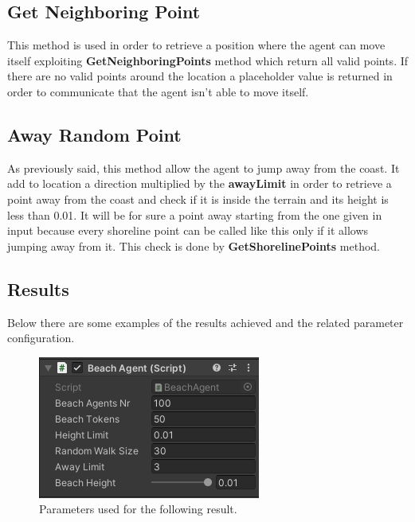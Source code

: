 \documentclass[12pt]{article}
\begin{document}
    \subsection{Get Neighboring Point}
    This method is used in order to retrieve a position where the agent can move itself exploiting \textbf{GetNeighboringPoints} method which return all
    valid points. If there are no valid points around the location a placeholder value is returned in order to communicate that the agent isn't able
    to move itself.

    \subsection{Away Random Point}
    As previously said, this method allow the agent to jump away from the coast. It add to location a direction multiplied by the \textbf{awayLimit} in order
    to retrieve a point away from the coast and check if it is inside the terrain and its height is less than 0.01. It will be for sure a point away starting
    from the one given in input because every shoreline point can be called like this only if it allows jumping away from it. This check is done by 
    \textbf{GetShorelinePoints} method.

    \subsection{Results}
    Below there are some examples of the results achieved and the related parameter configuration.

    \begin{figure}[H]
        \centering
        \includegraphics[scale = 0.8]{images/Beach agent/Parameters 1}
        \caption{Parameters used for the following result.}
    \end{figure}
\end{document}
